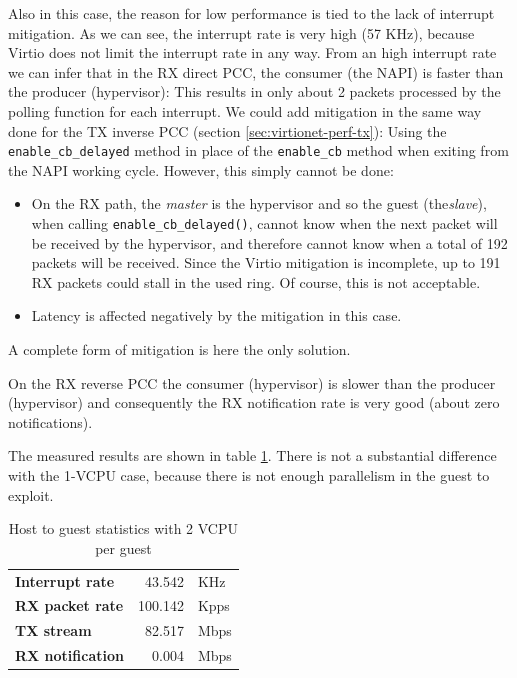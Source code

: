 Also in this case, the reason for low performance is tied to the lack of interrupt mitigation. As we can see, the interrupt rate is
very high (57 KHz), because Virtio does not limit the interrupt rate in any way. From an high interrupt rate we can infer that in the 
RX direct PCC, the consumer (the NAPI) is faster than the producer (hypervisor): This results in only about 2
packets processed by the polling function for each interrupt.
We could add mitigation in the same way done for the TX inverse PCC (section \ref{sec:virtionet-perf-tx}): Using
the \texttt{enable\_cb\_delayed} method in place of the \texttt{enable\_cb} method when exiting from the NAPI working cycle.
However, this simply cannot be done:
\begin{itemize}
  \item On the RX path, the \emph{master} is the hypervisor and so the guest (the\emph{slave}), when calling
	\texttt{enable\_cb\_delayed()}, cannot know when the next packet will be received by the hypervisor, and therefore cannot know
	when a total of 192 packets will be received. Since the Virtio mitigation is incomplete, up to 191 RX packets could stall
	in the used ring. Of course, this is not acceptable.
  \item Latency is affected negatively by the mitigation in this case.
\end{itemize}
A complete form of mitigation is here the only solution.

\vspace{0.5cm}

On the RX reverse PCC the consumer (hypervisor) is slower than the producer (hypervisor) and consequently the RX notification rate is
very good (about zero notifications).

\vspace{0.5cm}

The measured results are shown in table \ref{tab:virtionet-rx-g2hvcpu}. There is not a substantial difference with the 1-VCPU case, because
there is not enough parallelism in the guest to exploit.

\begin{table}
\begin{center}
\begin{tabular}{lrl}
\toprule
\textbf{Interrupt rate} & 43.542 & KHz\\
\textbf{RX packet rate} & 100.142 & Kpps\\
\textbf{TX stream} & 82.517 & Mbps\\
\textbf{RX notification} & 0.004 & Mbps\\
\bottomrule
\end{tabular}
\end{center}
\caption{Host to guest statistics with 2 VCPU per guest}
\label{tab:virtionet-rx-g2hvcpu}
\end{table}



